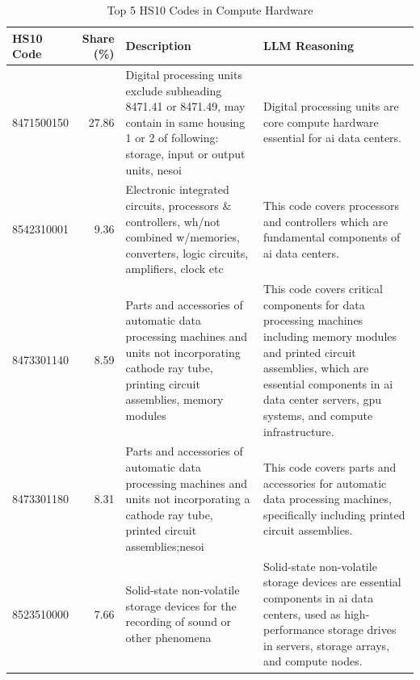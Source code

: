 \begin{table}[htbp]
\centering
\caption{Top 5 HS10 Codes in Compute Hardware}
\label{tab:top5_compute_hardware}
\begin{tabular}{lrp{5.5cm}p{5.5cm}}
\toprule
HS10 Code & Share (\%) & Description & LLM Reasoning \\
\midrule
8471500150 & 27.86 & {\footnotesize Digital processing units exclude subheading 8471.41 or 8471.49, may contain in same housing 1 or 2 of following: storage, input or output units, nesoi} & {\footnotesize Digital processing units are core compute hardware essential for ai data centers.} \\
8542310001 & 9.36 & {\footnotesize Electronic integrated circuits, processors \& controllers, wh/not combined w/memories, converters, logic circuits, amplifiers, clock etc} & {\footnotesize This code covers processors and controllers which are fundamental components of ai data centers.} \\
8473301140 & 8.59 & {\footnotesize Parts and accessories of automatic data processing machines and units not incorporating cathode ray tube, printing circuit assemblies, memory modules} & {\footnotesize This code covers critical components for data processing machines including memory modules and printed circuit assemblies, which are essential components in ai data center servers, gpu systems, and compute infrastructure.} \\
8473301180 & 8.31 & {\footnotesize Parts and accessories of automatic data processing machines and units not incorporating a cathode ray tube, printed circuit assemblies;nesoi} & {\footnotesize This code covers parts and accessories for automatic data processing machines, specifically including printed circuit assemblies.} \\
8523510000 & 7.66 & {\footnotesize Solid-state non-volatile storage devices for the recording of sound or other phenomena} & {\footnotesize Solid-state non-volatile storage devices are essential components in ai data centers, used as high-performance storage drives in servers, storage arrays, and compute nodes.} \\
\bottomrule
\end{tabular}
\end{table}
